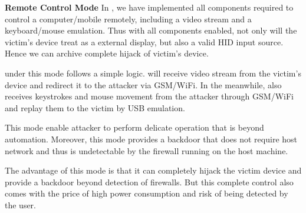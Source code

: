 \textbf{Remote Control Mode}
In \tool, we have implemented all components required to control a computer/mobile remotely, including a video stream and a keyboard/mouse emulation. Thus with all components enabled, not only will the victim's device treat \tool as a external display, but also a valid HID input source. Hence we can archive complete hijack of victim's device.

\tool under this mode follows a simple logic. \tool will receive video stream from the victim's device and redirect it to the attacker via GSM/WiFi. In the meanwhile, \tool also receives keystrokes and mouse movement from the attacker through GSM/WiFi and replay them to the victim by USB emulation.

This mode enable attacker to perform delicate operation that is beyond automation. Moreover, this mode provides a backdoor that does not require host network and thus is undetectable by the firewall running on the host machine.

The advantage of this mode is that it can completely hijack the victim device and provide a backdoor beyond detection of firewalls. But this complete control also comes with the price of high power consumption and risk of being detected by the user.

